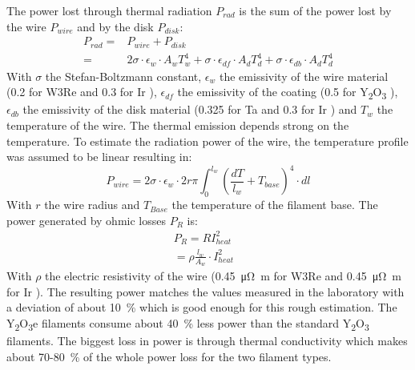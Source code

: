 		The power lost through thermal radiation $P_{rad}$ is the sum of the power lost by the wire $P_{wire}$ and by the disk $P_{disk}$:
		\begin{align}
			P_{rad} =& P_{wire} + P_{disk}\\
					=& 2\sigma\cdot\epsilon_{w}\cdot A_w T_w^4 + \sigma\cdot\epsilon_{df}\cdot A_d T_d^4 + \sigma\cdot\epsilon_{db}\cdot A_d T_d^4
		\end{align}
		With $\sigma$ the Stefan-Boltzmann constant, $\epsilon_{w}$ the emissivity of the wire material (0.2 for W3Re \cite{thermcondTungst} and 0.3 for Ir \cite{Burgess1914}), $\epsilon_{df}$ the emissivity of the coating (0.5 for Y\textsubscript{2}O\textsubscript{3} \cite{ThermEmiss_Y2O3}), $\epsilon_{db}$ the emissivity of the disk material (0.325 for Ta \cite{ThermalEmiss_Ta} and 0.3 for Ir \cite{Burgess1914}) and $T_w$ the temperature of the wire. The thermal emission depends strong on the temperature. To estimate the radiation power of the wire, the temperature profile was assumed to be linear resulting in:
		\begin{equation}
			P_{wire} = 2\sigma\cdot\epsilon_{w}\cdot2r\pi\int_{0}^{l_w} \left(\frac{dT}{l_w} + T_{base}\right)^4\cdot dl
		\end{equation}
		With $r$ the wire radius and $T_{Base}$ the temperature of the filament base. The power generated by ohmic losses $P_R$ is:
		\begin{align}
			P_R = RI_{heat}^2&\\
				= \rho\frac{l_w}{A_w}\cdot I_{heat}^2&
		\end{align}
		With $\rho$ the electric resistivity of the wire (0.45~\si{\micro\ohm\meter} for W3Re \cite{thermResistTungst} and 0.45~\si{\micro\ohm\meter} for Ir \cite{Arblaster2016}). The resulting power matches the values measured in the laboratory with a deviation of about 10~\% which is good enough for this rough estimation. The Y\textsubscript{2}O\textsubscript{3}e filaments consume about 40~\% less power than the standard Y\textsubscript{2}O\textsubscript{3} filaments. The biggest loss in power is through thermal conductivity which makes about 70-80~\% of the whole power loss for the two filament types.
		
		
